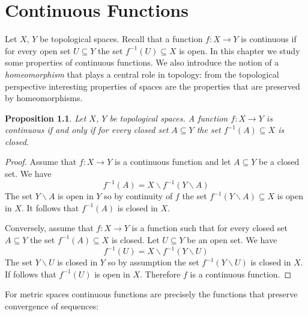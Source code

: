 \documentclass[11pt, letterpaper, oneside]{report}
\renewcommand{\chaptermark}[1]{\markboth{#1}{}}
\theoremstyle{pplain}
\newtheorem{proposition}[theorem]{Proposition}
\newtheorem{ITERMVALUE THM}[theorem]{Intermediate Value Theorem}
\newtheorem{HEINEBOREL THM}[theorem]{Heine-Borel Theorem}
\newtheorem{UMETR THM}[theorem]{Urysohn Metrization Theorem}
\newtheorem{UMETR2 THM}[theorem]{Urysohn Metrization Theorem (v.2)}
\theoremstyle{ddefinition}
\theoremstyle{nnn}
\newtheorem{TDA NN}[theorem]{Topological Data Analysis. }
\theoremstyle{eexercise}
\newcommand{\ssmin}{\smallsetminus}
\begin{document}
\newpage

\chapter{Continuous Functions}
\chaptermark{Continuous Functions}

\thispagestyle{firststyle}



Let $X$, $Y$ be topological spaces. Recall that a function $f\colon X\to Y$ is continuous 
if for every open set $U\subseteq Y$ the set $f^{-1}(U)\subseteq X$ is open. In this chapter 
we study some properties of continuous functions. We also introduce the notion of a 
\emph{homeomorphism} that plays a central role in topology: from the topological 
perspective interesting properties of spaces are the properties that are preserved by homeomorphisms.  

 \begin{proposition}
 \label{CONT VIA CLOSED PROP}
 Let $X$, $Y$ be topological spaces. A function $f\colon X\to Y$ is continuous if and only if
 for every closed set $A\subseteq Y$ the set $f^{-1}(A)\subseteq X$ is closed.  
 \end{proposition}
 
 \begin{proof}
Assume that  $f\colon X\to Y$ is a continuous function and let $A\subseteq Y$ be a closed 
set. We have 
$$f^{-1}(A) = X\ssmin f^{-1}(Y\ssmin A)$$
The set $Y\ssmin A$ is open in $Y$ so by continuity of $f$ the set $f^{-1}(Y\ssmin A)\subseteq X$
is open in $X$. It follows that $f^{-1}(A)$ is closed in $X$. 

Conversely, assume that $f\colon X\to Y$ is a function such that for every  closed set $A\subseteq Y$
the set $f^{-1}(A)\subseteq X$ is closed. Let $U\subseteq Y$ be an open set. We have  
$$f^{-1}(U) = X\ssmin f^{-1}(Y\ssmin U)$$
The set $Y\ssmin U$ is closed in $Y$ so by assumption 
the set $f^{-1}(Y\ssmin U)$ is closed in $X$. 
If follows that $f^{-1}(U)$ is open  in $X$. Therefore $f$ is a continuous function. 
 \end{proof}


For metric spaces continuous functions are precisely the functions that preserve convergence of sequences:
\end{document}
